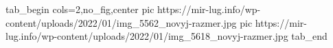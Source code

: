  
 
 
 
 

\ifcmt
  tab_begin cols=2,no_fig,center
     pic https://mir-lug.info/wp-content/uploads/2022/01/img_5562_novyj-razmer.jpg
		 pic https://mir-lug.info/wp-content/uploads/2022/01/img_5618_novyj-razmer.jpg
  tab_end
\fi
